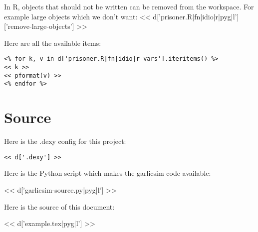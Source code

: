 \documentclass[a4paper]{tufte-handout}
\begin{document}
In R, objects that should not be written can be removed from the workspace. For
example large objects which we don't want:
<< d['prisoner.R|fn|idio|r|pyg|l']['remove-large-objects'] >>

Here are all the available items:

\begin{verbatim}
<% for k, v in d['prisoner.R|fn|idio|r-vars'].iteritems() %>
<< k >>
<< pformat(v) >>
<% endfor %>
\end{verbatim}

\section{Source}

Here is the .dexy config for this project:

\scriptsize
\begin{verbatim}
<< d['.dexy'] >>
\end{verbatim}
\normalsize

Here is the Python script which makes the garlicsim code available:

<< d['garlicsim-source.py|pyg|l'] >>

Here is the source of this document:

\scriptsize
<< d['example.tex|pyg|l'] >>
\end{document}
